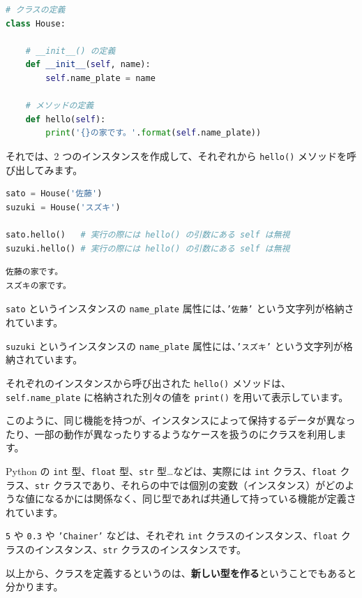 \begin{lstlisting}[style=codecell,language=Python]
# クラスの定義
class House:

    # __init__() の定義
    def __init__(self, name):
        self.name_plate = name

    # メソッドの定義
    def hello(self):
        print('{}の家です。'.format(self.name_plate))
\end{lstlisting}

それでは、2 つのインスタンスを作成して、それぞれから \texttt{hello()} メソッドを呼び出してみます。


\begin{lstlisting}[style=codecell,language=Python]
sato = House('佐藤')
suzuki = House('スズキ')

sato.hello()   # 実行の際には hello() の引数にある self は無視
suzuki.hello() # 実行の際には hello() の引数にある self は無視
\end{lstlisting}

\begin{lstlisting}[style=outputcell]
佐藤の家です。
スズキの家です。
\end{lstlisting}

\texttt{sato} というインスタンスの \texttt{name\_plate} 属性には、\texttt{'佐藤'} という文字列が格納されています。

\texttt{suzuki} というインスタンスの \texttt{name\_plate} 属性には、\texttt{'スズキ'} という文字列が格納されています。

それぞれのインスタンスから呼び出された \texttt{hello()} メソッドは、\texttt{self.name\_plate} に格納された別々の値を \texttt{print()} を用いて表示しています。


このように、同じ機能を持つが、インスタンスによって保持するデータが異なったり、一部の動作が異なったりするようなケースを扱うのにクラスを利用します。

Python の \texttt{int} 型、\texttt{float} 型、\texttt{str} 型…などは、実際には \texttt{int} クラス、\texttt{float} クラス、\texttt{str} クラスであり、それらの中では個別の変数（インスタンス）がどのような値になるかには関係なく、同じ型であれば共通して持っている機能が定義されています。

\texttt{5} や \texttt{0.3} や \texttt{'Chainer'} などは、それぞれ \texttt{int} クラスのインスタンス、\texttt{float} クラスのインスタンス、\texttt{str} クラスのインスタンスです。


以上から、クラスを定義するというのは、\textbf{新しい型を作る}ということでもあると分かります。


